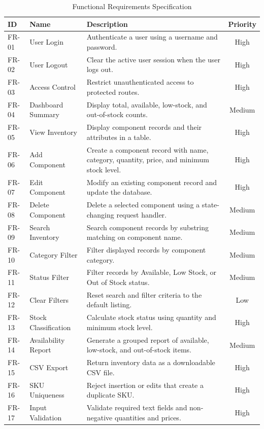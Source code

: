 \documentclass[conference]{IEEEtran}
\begin{document}
\begin{table}[!t]
\caption{Functional Requirements Specification}
\label{tab:functional}
\centering
\small
\begin{tabularx}{\textwidth}{l l Y c}
\toprule
\textbf{ID} & \textbf{Name} & \textbf{Description} & \textbf{Priority}\\
\midrule
FR-01 & User Login & Authenticate a user using a username and password. & High\\
FR-02 & User Logout & Clear the active user session when the user logs out. & High\\
FR-03 & Access Control & Restrict unauthenticated access to protected routes. & High\\
FR-04 & Dashboard Summary & Display total, available, low-stock, and out-of-stock counts. & Medium\\
FR-05 & View Inventory & Display component records and their attributes in a table. & High\\
FR-06 & Add Component & Create a component record with name, category, quantity, price, and minimum stock level. & High\\
FR-07 & Edit Component & Modify an existing component record and update the database. & High\\
FR-08 & Delete Component & Delete a selected component using a state-changing request handler. & Medium\\
FR-09 & Search Inventory & Search component records by substring matching on component name. & Medium\\
FR-10 & Category Filter & Filter displayed records by component category. & Medium\\
FR-11 & Status Filter & Filter records by Available, Low Stock, or Out of Stock status. & Medium\\
FR-12 & Clear Filters & Reset search and filter criteria to the default listing. & Low\\
FR-13 & Stock Classification & Calculate stock status using quantity and minimum stock level. & High\\
FR-14 & Availability Report & Generate a grouped report of available, low-stock, and out-of-stock items. & Medium\\
FR-15 & CSV Export & Return inventory data as a downloadable CSV file. & High\\
FR-16 & SKU Uniqueness & Reject insertion or edits that create a duplicate SKU. & High\\
FR-17 & Input Validation & Validate required text fields and non-negative quantities and prices. & High\\
\bottomrule
\end{tabularx}
\end{table}
\end{document}
